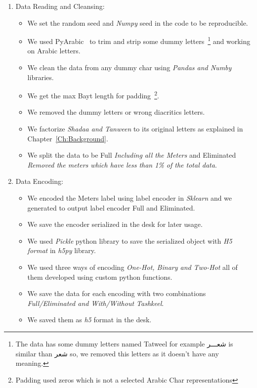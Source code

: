 \begin{enumerate}
  \item Data Reading and Cleansing:
  \begin{itemize}
    \item We set the random seed and \textit{Numpy} seed in the code to be reproducible.
    \item We used PyArabic~\cite{Pyarabic_2010} to trim and strip some dummy letters~\footnote{The data has some dummy letters named Tatweel for example \textarabic{شعـــر} is similar than \textarabic{شعر} so, we removed this letters as it doesn't have any meaning. } and working on Arabic letters.
    \item We clean the data from any dummy char using \textit{Pandas and Numby} libraries.
    \item We get the max Bayt length for padding~\footnote{Padding used zeros which is not a selected Arabic Char representations}.
    \item We removed the dummy letters or wrong diacritics letters.
    \item We factorize \textit{Shadaa and Tanween} to its original letters as explained in Chapter~\ref{Ch:Background}.
    \item We split the data to be Full\textit{ Including all the Meters} and Eliminated\textit{ Removed the meters which have less than 1\% of the total data}.
  \end{itemize}
  
  \item Data Encoding:
  \begin{itemize}
    \item We encoded the Meters label using label encoder in \textit{Sklearn} and we generated to output label encoder Full and Eliminated.
    \item We save the encoder serialized in the desk for later usage.
    \item We used \textit{Pickle} python library to save the serialized object with \textit{H5 format} in \textit{h5py} library.
    \item We used three ways of encoding \textit{One-Hot, Binary and Two-Hot} all of them developed using custom python functions.
    \item We save the data for each encoding with two combinations \textit{Full/Eliminated and With/Without Tashkeel}.
    \item We saved them as \textit{h5} format in the desk.
  \end{itemize}


\end{enumerate}
